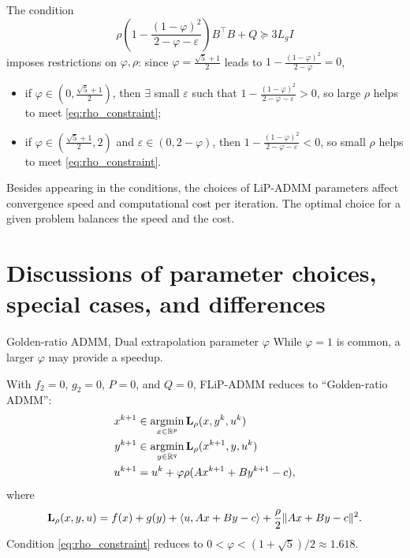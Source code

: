 \documentclass[10pt,mathserif]{beamer}
\begin{document}
\begin{frame}
The condition 
\begin{equation}
 \rho\left(1-\frac{(1-\varphi)^2}{2-\varphi-\varepsilon}\right) B^\intercal  B + Q \succeq  3L_g I
 \label{eq:rho_constraint}
\end{equation}
imposes restrictions on $\varphi,\rho$:
since $\varphi=\frac{\sqrt{5}+1}{2}$ leads to $1-\frac{(1-\varphi)^2}{2-\varphi}=0$,
\begin{itemize}
  \item if $\varphi\in(0,\frac{\sqrt{5}+1}{2})$, then $\exists$ small $\varepsilon$ such that $1-\frac{(1-\varphi)^2}{2-\varphi-\varepsilon}>0$, so large $\rho$ helps to meet \eqref{eq:rho_constraint};
  \item if $\varphi\in(\frac{\sqrt{5}+1}{2},2)$ and $\varepsilon\in(0,2-\varphi)$, then $1-\frac{(1-\varphi)^2}{2-\varphi-\varepsilon}<0$, so small $\rho$ helps to meet \eqref{eq:rho_constraint}.
\end{itemize}

\pause\medskip

Besides appearing in the conditions, the choices of LiP-ADMM parameters affect convergence speed and computational cost per iteration.
The optimal choice for a given problem balances the speed and the cost.
\end{frame}

\section{Discussions of parameter choices, special cases, and differences}

\begin{frame}{Golden-ratio ADMM, Dual extrapolation parameter $\varphi$}
While $\varphi=1$ is common, a larger $\varphi$ may provide a speedup.
\medskip

With $f_2=0$, $g_2=0$, $P=0$, and $Q=0$, FLiP-ADMM reduces to ``Golden-ratio ADMM'':
\begin{align*}
x^{k+1}&\in
 \operatorname*{argmin}_{x\in \mathbb{R}^p}  \mathbf{L}_\rho(x,y^k,u^k)\\
 y^{k+1}&\in
 \operatorname*{argmin}_{y\in \mathbb{R}^q}\mathbf{L}_\rho(x^{k+1},y,u^k) \\
u^{k+1}&=u^k+\varphi\rho(Ax^{k+1}+By^{k+1}-c),
\end{align*}
where
\[
\mathbf{L}_\rho (x,y,u )=f(x)+g(y)+\langle u , Ax+By-c\rangle+\frac{\rho}{2}\|Ax+By-c\|^2.
\]
Condition \eqref{eq:rho_constraint} reduces to $0<\varphi < (1+\sqrt{5})/2\approx 1.618$.
\end{frame}
\end{document}

